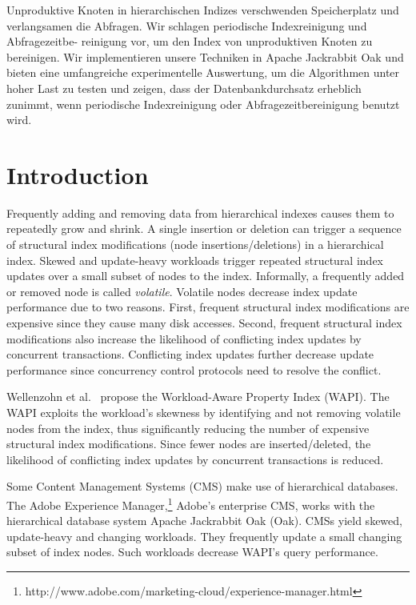 \documentclass[abstracton,12pt]{scrartcl}
\theoremstyle{definition}
\begin{document}
Unproduktive Knoten in hierarchischen Indizes verschwenden Speicherplatz und
verlangsamen die Abfragen. Wir schlagen periodische Indexreinigung
und Abfragezeitbe- reinigung vor, um den Index von unproduktiven Knoten zu
bereinigen. Wir implementieren
unsere Techniken in Apache Jackrabbit Oak und bieten eine umfangreiche
experimentelle Auswertung, um die Algorithmen unter hoher Last zu testen und
zeigen, dass der Datenbankdurchsatz erheblich zunimmt, wenn periodische
Indexreinigung oder Abfragezeitbereinigung benutzt wird.

\newpage
\thispagestyle{empty}

\tableofcontents

\newpage
\thispagestyle{empty}

\listoffigures

\newpage


\section{Introduction}

Frequently adding and removing data from hierarchical indexes causes them to
repeatedly grow and shrink. A single insertion or deletion can trigger a
sequence of structural index modifications (node insertions/deletions) in a
hierarchical index. Skewed and update-heavy workloads trigger repeated
structural index updates over a small subset of nodes to the index.
Informally, a frequently added or removed node is called \textit{volatile}.
Volatile nodes decrease index update performance due to two reasons. First,
frequent structural index modifications are expensive since they cause many disk
accesses. Second, frequent structural index modifications also increase the
likelihood of conflicting index updates by concurrent transactions. Conflicting
index updates further decrease update performance since concurrency control
protocols need to resolve the conflict.

Wellenzohn et al.~\cite{KW17} propose the Workload-Aware Property Index (WAPI).
The WAPI exploits the workload's skewness by identifying and not removing
volatile nodes from the index, thus significantly reducing the number of
expensive structural index modifications. Since fewer nodes are
inserted/deleted, the likelihood of conflicting index updates by concurrent
transactions is reduced.

Some Content Management Systems (CMS) make use of hierarchical 
databases. The Adobe Experience
Manager,\footnote{http://www.adobe.com/marketing-cloud/experience-manager.html}
Adobe's enterprise CMS, works with the hierarchical database system Apache
Jackrabbit Oak (Oak). CMSs yield skewed, update-heavy and changing
workloads. They frequently update a small changing subset of index nodes. Such
workloads decrease WAPI's query performance.
\end{document}
